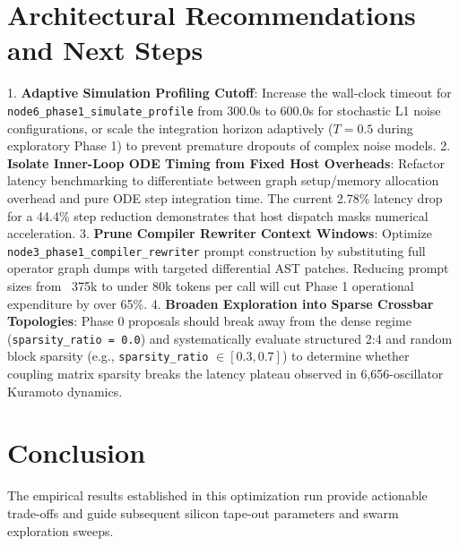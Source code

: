 \documentclass[10pt,conference]{IEEEtran}
\begin{document}
\section{Architectural Recommendations and Next Steps}
1. \textbf{Adaptive Simulation Profiling Cutoff}: Increase the wall-clock timeout for \texttt{node6\_phase1\_simulate\_profile} from 300.0s to 600.0s for stochastic L1 noise configurations, or scale the integration horizon adaptively ($T = 0.5$ during exploratory Phase 1) to prevent premature dropouts of complex noise models.
2. \textbf{Isolate Inner-Loop ODE Timing from Fixed Host Overheads}: Refactor latency benchmarking to differentiate between graph setup/memory allocation overhead and pure ODE step integration time. The current 2.78\% latency drop for a 44.4\% step reduction demonstrates that host dispatch masks numerical acceleration.
3. \textbf{Prune Compiler Rewriter Context Windows}: Optimize \texttt{node3\_phase1\_compiler\_rewriter} prompt construction by substituting full operator graph dumps with targeted differential AST patches. Reducing prompt sizes from ~375k to under 80k tokens per call will cut Phase 1 operational expenditure by over 65\%.
4. \textbf{Broaden Exploration into Sparse Crossbar Topologies}: Phase 0 proposals should break away from the dense regime (\texttt{sparsity\_ratio = 0.0}) and systematically evaluate structured 2:4 and random block sparsity (e.g., \texttt{sparsity\_ratio} $\in [0.3, 0.7]$) to determine whether coupling matrix sparsity breaks the latency plateau observed in 6,656-oscillator Kuramoto dynamics.

\section{Conclusion}
The empirical results established in this optimization run provide actionable trade-offs and guide subsequent silicon tape-out parameters and swarm exploration sweeps.
\end{document}
